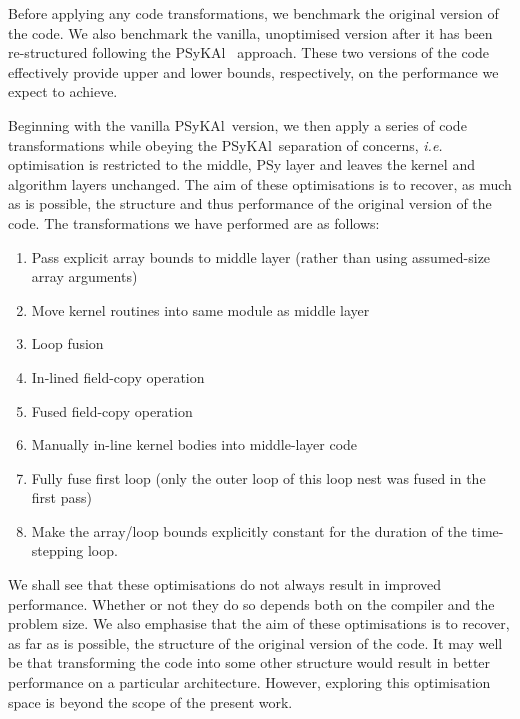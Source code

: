 \documentclass[journal]{IEEEtran}
\newcommand{\psykal}{{PS}y{KA}l\ }
\begin{document}
Before applying any code transformations, we benchmark the original
version of the code. We also benchmark the vanilla, unoptimised
version after it has been re-structured following the \psykal
approach. These two versions of the code effectively provide upper and
lower bounds, respectively, on the performance we expect to achieve.

Beginning with the vanilla \psykal version, we then apply a series of
code transformations while obeying the \psykal separation of concerns,
{\it i.e.} optimisation is restricted to the middle, {PS}y layer and leaves
the kernel and algorithm layers unchanged. The aim of these
optimisations is to recover, as much as is possible, the structure and
thus performance of the original version of the code. The
transformations we have performed are as follows:
\begin{enumerate}

\item Pass explicit array bounds to middle layer (rather than using
  assumed-size array arguments)

\item Move kernel routines into same module as middle layer

\item Loop fusion

\item In-lined field-copy operation

\item Fused field-copy operation

\item Manually in-line kernel bodies into middle-layer code

\item Fully fuse first loop (only the outer loop of this loop nest was
  fused in the first pass)

\item Make the array/loop bounds explicitly constant for the
      duration of the time-stepping loop.
\end{enumerate}

We shall see that these optimisations do not always result in improved
performance. Whether or not they do so depends both on the compiler
and the problem size. We also emphasise that the aim of these
optimisations is to recover, as far as is possible, the structure of
the original version of the code. It may well be that transforming the
code into some other structure would result in better performance on a
particular architecture. However, exploring this optimisation space is
beyond the scope of the present work.
\end{document}
